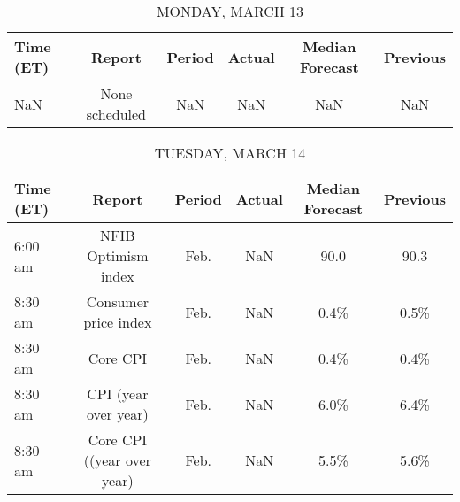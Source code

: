 \documentclass{article}%
\begin{document}
%
\normalsize%


\begin{table}[htbp]%
\caption{MONDAY, MARCH 13}%
\centering%
\begin{adjustbox}{width=1\textwidth}%
\begin{tabular}{lccccc}
\toprule
Time (ET) &         Report & Period & Actual & Median Forecast & Previous \\
\midrule
      NaN & None scheduled &    NaN &    NaN &             NaN &      NaN \\
\bottomrule
\end{tabular}
%
\end{adjustbox}%
\end{table}

%


\begin{table}[htbp]%
\caption{TUESDAY, MARCH 14}%
\centering%
\begin{adjustbox}{width=1\textwidth}%
\begin{tabular}{lccccc}
\toprule
Time (ET) &                     Report & Period & Actual & Median Forecast & Previous \\
\midrule
  6:00 am &        NFIB Optimism index &   Feb. &    NaN &            90.0 &     90.3 \\
  8:30 am &       Consumer price index &   Feb. &    NaN &            0.4\% &     0.5\% \\
  8:30 am &                   Core CPI &   Feb. &    NaN &            0.4\% &     0.4\% \\
  8:30 am &       CPI (year over year) &   Feb. &    NaN &            6.0\% &     6.4\% \\
  8:30 am & Core CPI ((year over year) &   Feb. &    NaN &            5.5\% &     5.6\% \\
\bottomrule
\end{tabular}
%
\end{adjustbox}%
\end{table}

%
\end{document}

